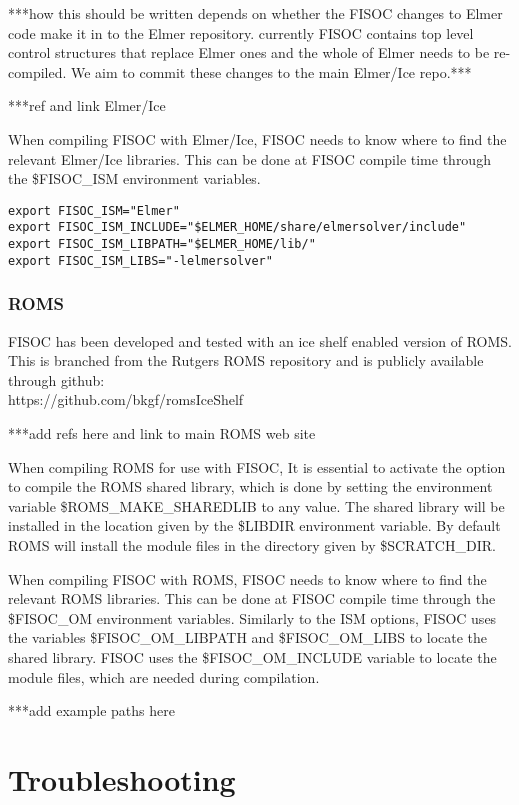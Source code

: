\documentclass[12pt]{article}
\begin{document}
***how this should be written depends on whether the FISOC changes to 
Elmer code make it in to the Elmer repository. currently FISOC contains 
top level control structures that replace Elmer ones and the whole of 
Elmer needs to be re-compiled.  We aim to commit these changes to the 
main Elmer/Ice repo.***

***ref and link Elmer/Ice

When compiling FISOC with Elmer/Ice, FISOC needs to know where to 
find the relevant Elmer/Ice libraries.  
This can be done at FISOC compile time through the 
\$FISOC\_ISM
environment variables.  


\begin{lstlisting}
export FISOC_ISM="Elmer"
export FISOC_ISM_INCLUDE="$ELMER_HOME/share/elmersolver/include"
export FISOC_ISM_LIBPATH="$ELMER_HOME/lib/"
export FISOC_ISM_LIBS="-lelmersolver"
\end{lstlisting}

\subsubsection{ROMS}
\label{sec:PreReqROMS}

FISOC has been developed and tested with an ice shelf enabled version of ROMS. 
This is branched from the Rutgers ROMS repository and is publicly available 
through github: \\
https://github.com/bkgf/romsIceShelf

***add refs here and link to main ROMS web site

When compiling ROMS for use with FISOC, It is essential to activate the option 
to compile the ROMS shared library, which 
is done by setting the environment variable \$ROMS\_MAKE\_SHAREDLIB to any value. 
The shared library will be installed in the location given by the 
 \$LIBDIR environment variable. 
By default ROMS will install the module files in the directory given by 
 \$SCRATCH\_DIR.  

When compiling FISOC with ROMS, FISOC needs to know where to 
find the relevant ROMS libraries.  
This can be done at FISOC compile time through the 
\$FISOC\_OM
environment variables.  
Similarly to the ISM options, FISOC uses the variables \$FISOC\_OM\_LIBPATH and
 \$FISOC\_OM\_LIBS to locate the shared library.
FISOC uses the  \$FISOC\_OM\_INCLUDE variable to locate the module files, 
which are needed during compilation.

***add example paths here

\section{Troubleshooting}
\end{document}
